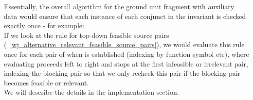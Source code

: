 Essentially, the overall algorithm for the ground unit fragment with auxiliary data would ensure that each instance of each conjunct in the invariant is checked exactly once - for example:\\
If we look at the rule for top-down feasible source pairs (~\ref{wj_alternative_relevant_feasible_source_pairs}), 
we would evaluate this rule once for each pair of \GFAs{} when  is established (indexing by function symbol etc), where evaluating  proceeds left to right and stops at the first infeasible or irrelevant pair, indexing the blocking pair so that we only recheck this \GFA{} pair if the blocking pair becomes feasible or relevant.\\
We will describe the details in the implementation section.

